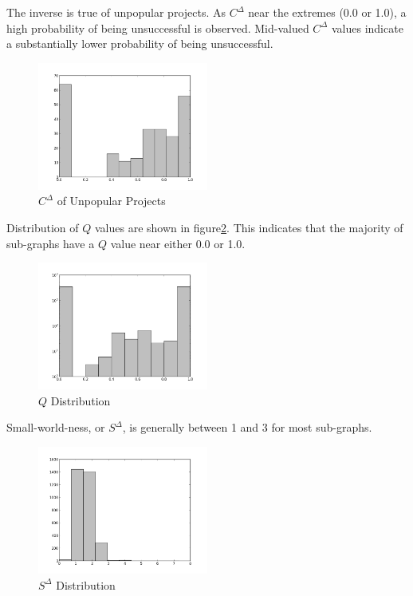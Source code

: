 \documentclass{proc}
\begin{document}
The inverse is true of unpopular projects. As $C^\Delta$ near the extremes (0.0 or 1.0), a high probability of being unsuccessful is observed. Mid-valued $C^\Delta$ values indicate a substantially lower probability of being unsuccessful.

\begin{figure}
\begin{center}
\includegraphics[width=0.5\textwidth]{images/freecode-unpopular.png}
\end{center}
\caption{$C^\Delta$ of Unpopular Projects}
\label{fig:cc_unpopular}
\end{figure}

Distribution of $Q$ values are shown in figure\ref{fig:q_distribution}. This indicates that the majority of sub-graphs have a $Q$ value near either 0.0 or 1.0. 


\begin{figure}
\begin{center}
\includegraphics[width=0.5\textwidth]{images/freecode-q-histo.png}
\end{center}
\caption{$Q$ Distribution}
\label{fig:q_distribution}
\end{figure}

Small-world-ness, or $S^\Delta$, is generally between 1 and 3 for most sub-graphs.

\begin{figure}
\begin{center}
\includegraphics[width=0.5\textwidth]{images/freecode-smallworld-histo.png}
\end{center}
\caption{$S^\Delta$ Distribution}
\label{fig:sw_distribution}
\end{figure}
\end{document}
